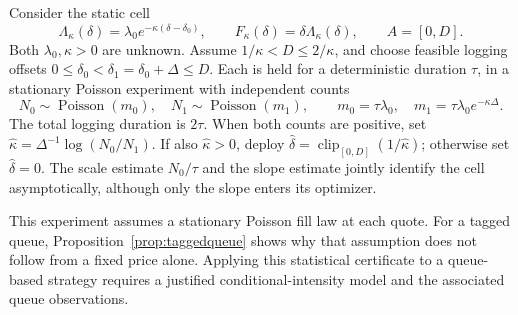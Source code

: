 \documentclass[11pt]{article}
\theoremstyle{plain}
\theoremstyle{definition}
\theoremstyle{remark}
\begin{document}
Consider the static cell
\[
\Lambda_\kappa(\delta)=\lambda_0e^{-\kappa(\delta-\delta_0)},
\qquad F_\kappa(\delta)=\delta\Lambda_\kappa(\delta),
\qquad A=[0,D].
\]
Both \(\lambda_0,\kappa>0\) are unknown. Assume
\(1/\kappa<D\le2/\kappa\), and choose feasible logging offsets
\(0\le\delta_0<\delta_1=\delta_0+\Delta\le D\).
Each is held for a deterministic duration \(\tau\), in a stationary
Poisson experiment with independent counts
\[
N_0\sim\operatorname{Poisson}(m_0),\quad
N_1\sim\operatorname{Poisson}(m_1),\qquad
m_0=\tau\lambda_0,\quad m_1=\tau\lambda_0e^{-\kappa\Delta}.
\]
The total logging duration is \(2\tau\). When both counts are positive,
set \(\widehat\kappa=\Delta^{-1}\log(N_0/N_1)\).
If also \(\widehat\kappa>0\), deploy
\(\widehat\delta=\operatorname{clip}_{[0,D]}(1/\widehat\kappa)\);
otherwise set \(\widehat\delta=0\).
The scale estimate \(N_0/\tau\) and the slope estimate jointly identify
the cell asymptotically, although only the slope enters its optimizer.

This experiment assumes a stationary Poisson fill law at each quote.
For a tagged queue, Proposition~\ref{prop:taggedqueue} shows why that
assumption does not follow from a fixed price alone. Applying this
statistical certificate to a queue-based strategy requires a justified
conditional-intensity model and the associated queue observations.
\end{document}
